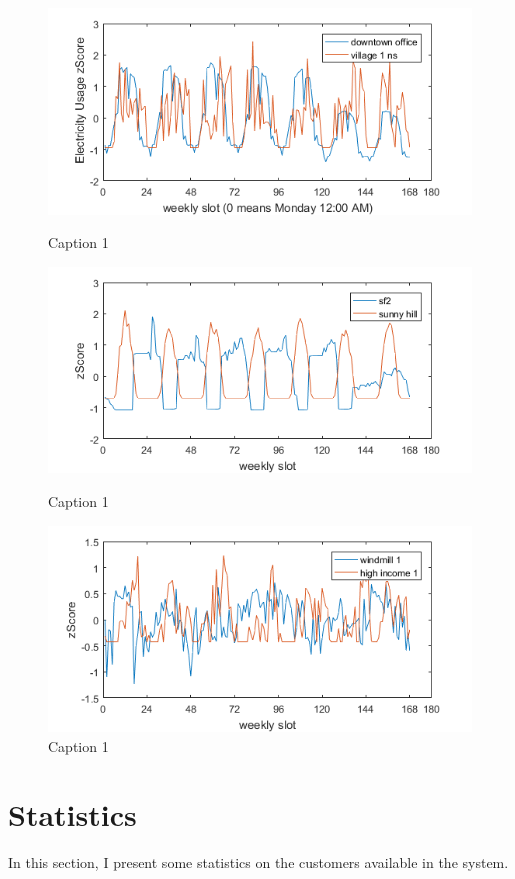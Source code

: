 \begin{figure}[!h]
\centering
\includegraphics{weekly1.png}
\caption{Caption 1}
\label{fig:weekly1}
\includegraphics{weekly2.png}
\caption{Caption 1}
\label{fig:weekly2}
\includegraphics{weekly3.png}
\caption{Caption 1}
\label{fig:weekly3}
\end{figure}


\section{Statistics}
In this section, I present some statistics on the customers available in the system. 

